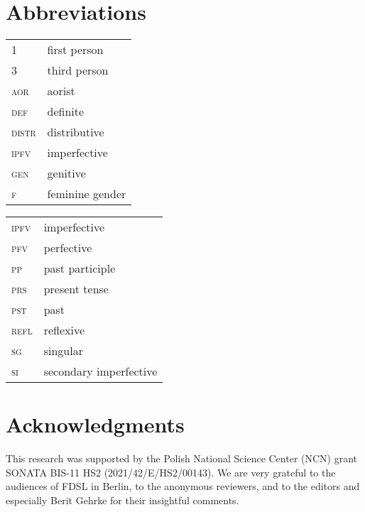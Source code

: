 \documentclass[output=paper,colorlinks,citecolor=brown]{langscibook}
\begin{document}

\section*{Abbreviations}

\begin{tabularx}{.5\textwidth}{@{}lQ}
\textsc{1}&first person\\
\textsc{3}&third person\\
\textsc{aor}&aorist\\
\textsc{def}&definite\\
\textsc{distr}&distributive\\
\textsc{ipfv}&imperfective\\
\textsc{gen}&genitive\\
\textsc{f}&feminine gender\\
\end{tabularx}%
\begin{tabularx}{.5\textwidth}{lQ@{}}
\textsc{ipfv}&imperfective\\
\textsc{pfv}&perfective\\
\textsc{pp}&past participle\\
\textsc{prs}&present tense\\
\textsc{pst}&past\\
\textsc{refl}&reflexive\\
\textsc{sg}&singular\\
\textsc{si}&secondary imperfective\\

\end{tabularx}

\section*{Acknowledgments}
This research was supported by the Polish National Science Center (NCN) grant SONATA BIS-11 HS2 (2021/42/E/HS2/00143). We are very grateful to the audiences of FDSL in Berlin, to the anonymous reviewers, and to the editors and especially Berit Gehrke for their insightful comments.

\printbibliography[heading=subbibliography,notkeyword=this]
\end{document}
